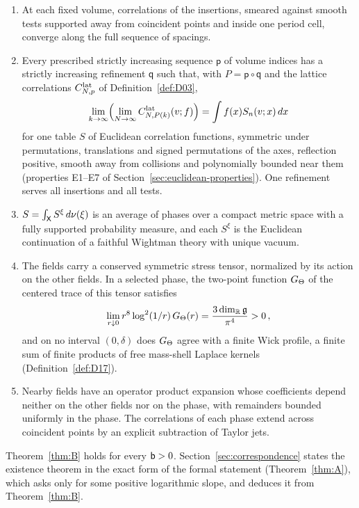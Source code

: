 \begin{enumerate}[label=\textup{(\roman*)},nosep]
\item At each fixed volume, correlations of the insertions, smeared against smooth tests supported away from coincident points and inside one period cell, converge along the full sequence of spacings.
\item Every prescribed strictly increasing sequence $\mathsf p$ of volume indices has a strictly increasing refinement $\mathsf q$ such that, with $P=\mathsf p\circ\mathsf q$ and the lattice correlations $C^{\mathrm{lat}}_{N,p}$ of Definition~\ref{def:D03},
\begin{equation}\label{eq:intro-ordered-limit}
\lim_{k\to\infty}\Bigl(\lim_{N\to\infty}C^{\mathrm{lat}}_{N,P(k)}(v;f)\Bigr)=\int f(x)S_n(v;x)\,dx
\end{equation}
for one table $S$ of Euclidean correlation functions, symmetric under permutations, translations and signed permutations of the axes, reflection positive, smooth away from collisions and polynomially bounded near them (properties E1--E7 of Section~\ref{sec:euclidean-properties}). One refinement serves all insertions and all tests.
\item $S=\int_{\mathsf{X}}S^\xi\,d\nu(\xi)$ is an average of phases over a compact metric space with a fully supported probability measure, and each $S^\xi$ is the Euclidean continuation of a faithful Wightman theory with unique vacuum.
\item The fields carry a conserved symmetric stress tensor, normalized by its action on the other fields. In a selected phase, the two-point function $G_{\Theta}$ of the centered trace of this tensor satisfies
\begin{equation}\label{eq:intro-trace-law}
\lim_{r\downarrow0}r^8\log^2(1/r)\,G_{\Theta}(r)=\frac{3\dim_{\mathbb{R}}\mathfrak{g}}{\pi^4}>0\,,
\end{equation}
and on no interval $(0,\delta)$ does $G_{\Theta}$ agree with a finite Wick profile, a finite sum of finite products of free mass-shell Laplace kernels (Definition~\ref{def:D17}).
\item Nearby fields have an operator product expansion whose coefficients depend neither on the other fields nor on the phase, with remainders bounded uniformly in the phase. The correlations of each phase extend across coincident points by an explicit subtraction of Taylor jets.
\end{enumerate}
Theorem~\ref{thm:B} holds for every $\mathsf{b}>0$. Section~\ref{sec:correspondence} states the existence theorem in the exact form of the formal statement (Theorem~\ref{thm:A}), which asks only for some positive logarithmic slope, and deduces it from Theorem~\ref{thm:B}.

